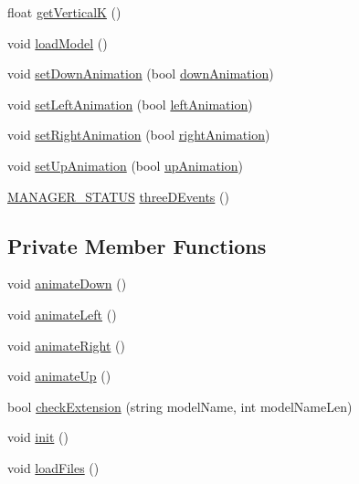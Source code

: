 \begin{DoxyCompactItemize}
\item 
float \hyperlink{classThreeD_a74821e7c91af85568683304e80ccc9c0}{get\+VerticalK} ()
\item 
void \hyperlink{classThreeD_aa316c4fce37636fd97bef3667ef17ea4}{load\+Model} ()
\item 
void \hyperlink{classThreeD_a0ce89ac20ecb8f1082cdf600e5f6e5ae}{set\+Down\+Animation} (bool \hyperlink{classThreeD_ad0852e7fce074e4bd6fbe6ea59d1fdd0}{down\+Animation})
\item 
void \hyperlink{classThreeD_a136f44c031431eb378b46d0807f141c7}{set\+Left\+Animation} (bool \hyperlink{classThreeD_a93f3dd02240c35bd5f55fc3660ceb53b}{left\+Animation})
\item 
void \hyperlink{classThreeD_a681915094facd4f2be2825ffe3a18c24}{set\+Right\+Animation} (bool \hyperlink{classThreeD_a9fd46e1b3cd60888cfe0506f937ef55b}{right\+Animation})
\item 
void \hyperlink{classThreeD_a715a9ef2706849b06ab647db18ddd263}{set\+Up\+Animation} (bool \hyperlink{classThreeD_a94906891c06e47023741a95039a74454}{up\+Animation})
\item 
\hyperlink{Global_8h_a94049c48a0d77b80bca0fcb5b1281516}{M\+A\+N\+A\+G\+E\+R\+\_\+\+S\+T\+A\+T\+US} \hyperlink{classThreeD_a58be5f1ca95e67bf3d12288ec03e8965}{three\+D\+Events} ()
\end{DoxyCompactItemize}
\subsection*{Private Member Functions}
\begin{DoxyCompactItemize}
\item 
void \hyperlink{classThreeD_adcffb8f499342872638329da9cbb4254}{animate\+Down} ()
\item 
void \hyperlink{classThreeD_a61250e4f3656d4a641f4cdc6e5d56e2a}{animate\+Left} ()
\item 
void \hyperlink{classThreeD_a7e019fc338c273b0393e51b76f149e71}{animate\+Right} ()
\item 
void \hyperlink{classThreeD_af1ac9f112fd22e091e4f8edee2b402e9}{animate\+Up} ()
\item 
bool \hyperlink{classThreeD_a5e1ac5bc4d6dfdce40bd8e0a70c436d5}{check\+Extension} (string model\+Name, int model\+Name\+Len)
\item 
void \hyperlink{classThreeD_a7b7f6a67430d8adea226c469ae550ede}{init} ()
\item 
void \hyperlink{classThreeD_a77f141ee72cfd90b713081bc77be3ac5}{load\+Files} ()
\end{DoxyCompactItemize}
